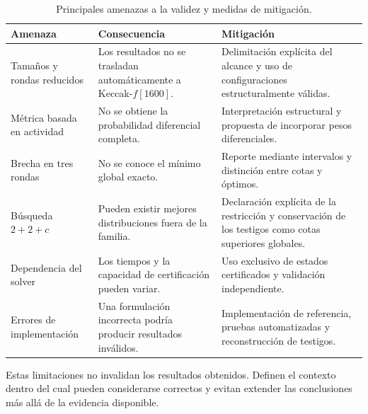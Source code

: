 \begin{table}[htbp]
    \centering
    \caption{Principales amenazas a la validez y medidas de mitigación.}
    \label{tab:amenazas_validez}
    \begin{tabular}{
        p{}
        p{}
        p{}
    }
        \hline
        \textbf{Amenaza}
        &
        \textbf{Consecuencia}
        &
        \textbf{Mitigación}
        \\
        \hline

        Tamaños y rondas reducidos
        &
        Los resultados no se trasladan automáticamente a Keccak-$f[1600]$.
        &
        Delimitación explícita del alcance y uso de configuraciones
        estructuralmente válidas.
        \\[4pt]

        Métrica basada en actividad
        &
        No se obtiene la probabilidad diferencial completa.
        &
        Interpretación estructural y propuesta de incorporar pesos
        diferenciales.
        \\[4pt]

        Brecha en tres rondas
        &
        No se conoce el mínimo global exacto.
        &
        Reporte mediante intervalos y distinción entre cotas y óptimos.
        \\[4pt]

        Búsqueda $2+2+c$
        &
        Pueden existir mejores distribuciones fuera de la familia.
        &
        Declaración explícita de la restricción y conservación de los
        testigos como cotas superiores globales.
        \\[4pt]

        Dependencia del solver
        &
        Los tiempos y la capacidad de certificación pueden variar.
        &
        Uso exclusivo de estados certificados y validación independiente.
        \\[4pt]

        Errores de implementación
        &
        Una formulación incorrecta podría producir resultados inválidos.
        &
        Implementación de referencia, pruebas automatizadas y
        reconstrucción de testigos.
        \\
        \hline
    \end{tabular}
\end{table}

Estas limitaciones no invalidan los resultados obtenidos. Definen el
contexto dentro del cual pueden considerarse correctos y evitan extender
las conclusiones más allá de la evidencia disponible.